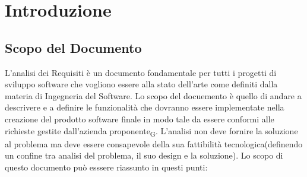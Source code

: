 \section{Introduzione}
\subsection{Scopo del Documento}
L'analisi dei Requisiti è un documento fondamentale per tutti i progetti di sviluppo software che vogliono essere alla stato dell'arte come definiti dalla materia di Ingegneria del Software.
Lo scopo del docuemento è quello di andare a descrivere e a definire le funzionalità che dovranno essere implementate nella creazione del prodotto software finale in modo tale da essere conformi alle richieste gestite dall'azienda proponente\textsubscript{G}.
L'analisi non deve fornire la soluzione al problema ma deve essere consapevole della sua fattibilità tecnologica(definendo un confine tra analisi del problema, il suo design e la soluzione). Lo scopo di questo documento può esssere riassunto in questi punti:
